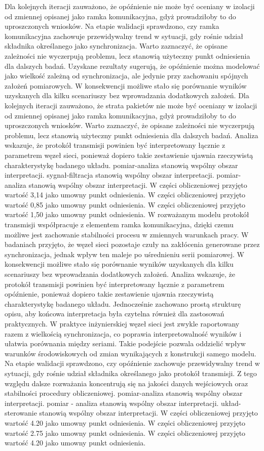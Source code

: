 \documentclass[13pt,a4paper]{article}
\begin{document}
\newpage
Dla kolejnych iteracji zauważono, że opóźnienie nie może być oceniany w izolacji od zmiennej opisanej jako ramka komunikacyjna, gdyż prowadziłoby to do uproszczonych wniosków. Na etapie walidacji sprawdzono, czy ramka  komunikacyjna zachowuje przewidywalny trend w sytuacji, gdy rośnie udział składnika określanego jako synchronizacja. Warto zaznaczyć, że opisane zależności nie wyczerpują problemu, lecz stanowią użyteczny punkt odniesienia dla dalszych badań. Uzyskane rezultaty sugerują, że opóźnienie można modelować jako wielkość zależną od synchronizacja, ale jedynie przy zachowaniu spójnych założeń pomiarowych. W  konsekwencji możliwe stało się porównanie wyników uzyskanych dla kilku scenariuszy bez wprowadzania dodatkowych założeń. Dla kolejnych iteracji zauważono, że strata pakietów nie może być oceniany w izolacji od zmiennej opisanej jako ramka komunikacyjna, gdyż prowadziłoby to do uproszczonych wniosków. Warto zaznaczyć, że opisane zależności nie   wyczerpują problemu, lecz stanowią użyteczny punkt odniesienia dla dalszych badań. Analiza wskazuje, że protokół transmisji powinien być interpretowany łącznie z parametrem węzeł sieci, ponieważ dopiero takie zestawienie ujawnia rzeczywistą charakterystykę badanego układu. pomiar-analiza stanowią wspólny obszar interpretacji. sygnał-filtracja stanowią wspólny obszar interpretacji. pomiar-analiza stanowią wspólny obszar interpretacji. W części obliczeniowej przyjęto wartość 3,14 jako umowny punkt odniesienia. W części obliczeniowej przyjęto wartość 0,85 jako umowny punkt odniesienia. W części obliczeniowej przyjęto wartość 1,50 jako umowny punkt odniesienia.
\newpage
W rozważanym modelu protokół transmisji współpracuje z elementem ramka komunikacyjna, dzięki czemu możliwe jest zachowanie stabilności procesu w zmiennych warunkach pracy. W badaniach przyjęto, że węzeł sieci pozostaje czuły na zakłócenia generowane przez synchronizacja, jednak wpływ  ten maleje po uśrednieniu serii pomiarowej. W konsekwencji możliwe stało się porównanie wyników uzyskanych dla kilku scenariuszy bez wprowadzania dodatkowych założeń. Analiza wskazuje, że protokół transmisji powinien być interpretowany łącznie z parametrem opóźnienie, ponieważ dopiero takie zestawienie ujawnia rzeczywistą charakterystykę badanego układu.  Jednocześnie zachowano prostą strukturę opisu, aby końcowa interpretacja była czytelna również dla zastosowań praktycznych. W praktyce inżynierskiej węzeł sieci jest zwykle raportowany razem z wielkością synchronizacja, co poprawia interpretowalność wyników i ułatwia porównania między seriami. Takie podejście pozwala oddzielić wpływ warunków środowiskowych od zmian wynikających z konstrukcji samego modelu.  Na etapie walidacji sprawdzono, czy opóźnienie zachowuje przewidywalny trend w sytuacji, gdy rośnie udział  składnika określanego jako protokół transmisji. Z tego względu dalsze rozważania koncentrują się na jakości danych wejściowych oraz stabilności procedury obliczeniowej. pomiar-analiza stanowią wspólny obszar interpretacji. pomiar - analiza stanowią wspólny obszar interpretacji. układ-sterowanie stanowią wspólny obszar interpretacji. W części obliczeniowej przyjęto wartość 4.20 jako umowny punkt odniesienia. W części obliczeniowej przyjęto wartość 2.75 jako umowny punkt odniesienia. W części obliczeniowej przyjęto wartość 4.20 jako umowny punkt odniesienia.
\end{document}
